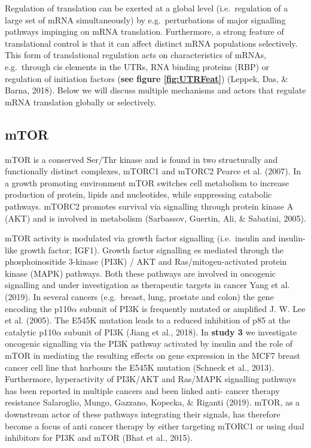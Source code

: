 \documentclass[
  12pt,
  openany]{book}
\begin{document}
Regulation of translation can be exerted at a global level (i.e.~regulation of a large set of mRNA simultaneously) by e.g.~perturbations of major signalling pathways impinging on mRNA translation. Furthermore, a strong feature of translational control is that it can affect distinct mRNA populations selectively. This form of translational regulation acts on characteristics of mRNAs, e.g.~through cis elements in the UTRs, RNA binding proteins (RBP) or regulation of initiation factors (\textbf{see figure \ref{fig:UTRFeat}}) (Leppek, Das, \& Barna, 2018). Below we will discuss multiple mechanisms and actors that regulate mRNA translation globally or selectively.

\subsection{mTOR} \label{mTOR}

mTOR is a conserved Ser/Thr kinase and is found in two structurally and functionally distinct complexes, mTORC1 and mTORC2 Pearce et al. (2007). In a growth promoting environment mTOR switches cell metabolism to increase production of protein, lipids and nucleotides, while suppressing catabolic pathways. mTORC2 promotes survival via signalling through protein kinase A (AKT) and is involved in metabolism (Sarbassov, Guertin, Ali, \& Sabatini, 2005).

mTOR activity is modulated via growth factor signalling (i.e.~insulin and insulin-like growth factor; IGF1). Growth factor signalling es mediated through the phosphoinositide 3-kinase (PI3K) / AKT and Ras/mitogen-activated protein kinase (MAPK) pathways. Both these pathways are involved in oncogenic signalling and under investigation as therapeutic targets in cancer Yang et al. (2019). In several cancers (e.g.~breast, lung, prostate and colon) the gene encoding the p110\(\alpha\) subunit of PI3K is frequently mutated or amplified J. W. Lee et al. (2005). The E545K mutation leads to a reduced inhibition of p85 at the catalytic p110\(\alpha\) subunit of PI3K (Jiang et al., 2018). In \textbf{study 3} we investigate oncogenic signalling via the PI3K pathway activated by insulin and the role of mTOR in mediating the resulting effects on gene expression in the MCF7 breast cancer cell line that harbours the E545K mutation (Schneck et al., 2013). Furthermore, hyperactivity of PI3K/AKT and Ras/MAPK signalling pathways has been reported in multiple cancers and been linked anti- cancer therapy resistance Salaroglio, Mungo, Gazzano, Kopecka, \& Riganti (2019). mTOR, as a downstream actor of these pathways integrating their signals, has therefore become a focus of anti cancer therapy by either targeting mTORC1 or using dual inhibitors for PI3K and mTOR (Bhat et al., 2015).
\end{document}
